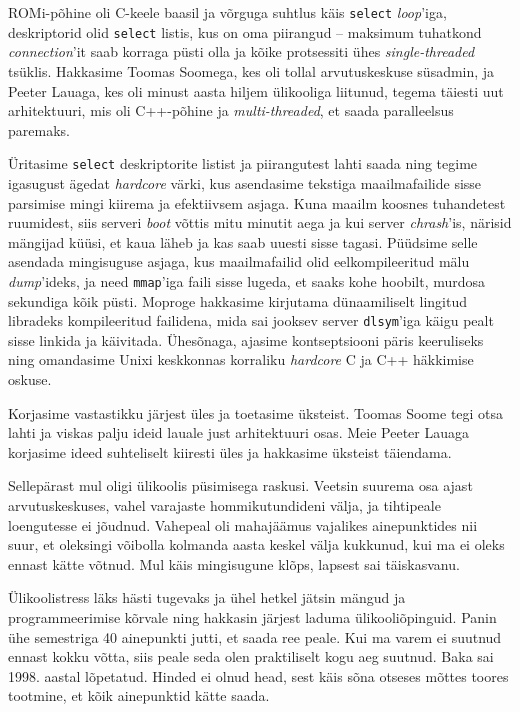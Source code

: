 ROMi-põhine oli C-keele baasil ja võrguga suhtlus 
käis \verb|select| \emph{loop}'iga, deskriptorid olid \verb|select| 
listis, kus on oma piirangud -- maksimum tuhatkond 
\emph{connection}'it saab korraga püsti olla ja kõike protsessiti ühes 
\emph{single-threaded} tsüklis. Hakkasime Toomas 
Soomega, kes oli tollal arvutuskeskuse süsadmin, 
ja Peeter Lauaga, kes oli minust aasta hiljem ülikooliga 
liitunud, tegema täiesti uut arhitektuuri, mis oli C++-põhine 
ja \emph{multi-threaded}, et saada paralleelsus paremaks. 

Üritasime 
\verb|select| deskriptorite listist ja piirangutest lahti saada ning
tegime igasugust ägedat \emph{hardcore} värki, kus asendasime tekstiga 
maailmafailide sisse parsimise mingi kiirema ja efektiivsem asjaga. Kuna 
maailm koosnes tuhandetest ruumidest, siis serveri \emph{boot} võttis 
mitu minutit aega ja kui server \emph{chrash}'is, närisid mängijad küüsi, et 
kaua läheb ja kas saab uuesti sisse tagasi. Püüdsime selle asendada 
mingisuguse asjaga, kus maailmafailid olid eelkompileeritud 
mälu \emph{dump}'ideks, ja need \verb|mmap|'iga faili sisse 
lugeda, et saaks kohe hoobilt, murdosa sekundiga kõik püsti. 
Moproge hakkasime kirjutama dünaamiliselt lingitud libradeks kompileeritud 
failidena, mida sai jooksev server \verb|dlsym|'iga käigu pealt sisse linkida ja 
käivitada. Ühesõnaga, ajasime kontseptsiooni päris keeruliseks ning omandasime Unixi keskkonnas
korraliku \emph{hardcore} C ja C++ häkkimise oskuse.


Korjasime vastastikku järjest üles ja toetasime üksteist. Toomas 
Soome tegi otsa lahti ja
viskas palju ideid lauale just arhitektuuri osas. Meie 
Peeter Lauaga korjasime ideed suhteliselt kiiresti 
üles ja hakkasime üksteist täiendama. 


Sellepärast mul oligi 
ülikoolis püsimisega raskusi. Veetsin suurema osa ajast 
arvutuskeskuses, vahel varajaste hommikutundideni välja, ja tihtipeale 
loengutesse ei jõudnud. Vahepeal oli mahajäämus vajalikes ainepunktides nii 
suur, et oleksingi võibolla kolmanda aasta keskel välja kukkunud, kui ma 
ei oleks ennast kätte võtnud. Mul käis mingisugune klõps, lapsest sai täiskasvanu. 

Ülikoolistress läks hästi tugevaks ja ühel hetkel jätsin 
mängud ja programmeerimise kõrvale ning hakkasin 
järjest laduma ülikooliõpinguid. Panin ühe 
semestriga 40 ainepunkti jutti, 
et saada ree peale. Kui ma varem ei suutnud 
ennast kokku võtta, siis peale seda olen praktiliselt kogu aeg 
suutnud. Baka sai 1998. aastal lõpetatud. Hinded ei olnud head, sest käis sõna otseses mõttes toores tootmine, et kõik ainepunktid 
kätte saada. 


